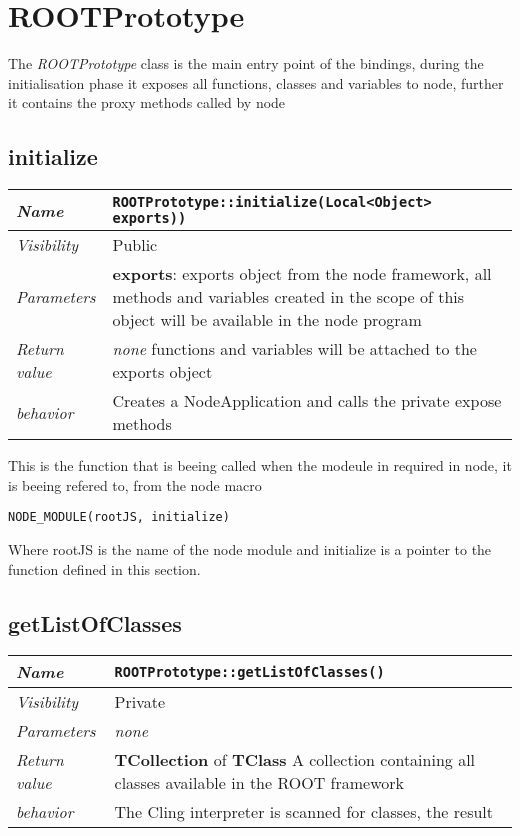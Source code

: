 \chapter{ROOTPrototype}
The \textit{ROOTPrototype} class is the main entry point of the bindings, during the initialisation phase it exposes all functions, classes and variables to node, further it contains the proxy methods called by node
\section{initialize}
\begin{longtable}{p{3cm} @{\hskip 1cm} p{12cm}}
  \hline
  \textit{Name} & \texttt{ROOTPrototype::initialize(Local<Object> exports))} \\
  \hline
  \textit{Visibility} & Public \\
  \hline
  \textit{Parameters} & \textbf{exports}: exports object from the node framework, all methods and variables created in the scope of this object will be available in the node program \\
  \hline
  \textit{Return value} & \textit{none} functions and variables will be attached to the exports object \\
  \hline
  \textit{behavior} & Creates a NodeApplication and calls the private expose methods \\
  \hline
\end{longtable}
This is the function that is beeing called when the modeule in required in node, it is beeing refered to, from the node macro
\begin{verbatim}
NODE_MODULE(rootJS, initialize)
\end{verbatim}
Where rootJS is the name of the node module and initialize is a pointer to the function defined in this section.
\newpage

\section{getListOfClasses}
\begin{longtable}{p{3cm} @{\hskip 1cm} p{12cm}}
  \hline
  \textit{Name} & \texttt{ROOTPrototype::getListOfClasses()} \\
  \hline
  \textit{Visibility} & Private \\
  \hline
  \textit{Parameters} & \textit{none} \\
  \hline
  \textit{Return value} & \textbf{TCollection} of \textbf{TClass} A collection containing all classes available in the ROOT framework \\
  \hline
  \textit{behavior} & The Cling interpreter is scanned for classes, the result \\
  \hline
\end{longtable}

